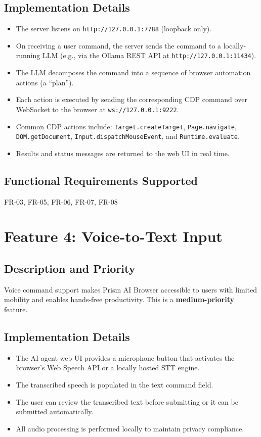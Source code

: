 \subsection{Implementation Details}
\begin{itemize}[leftmargin=*]
    \item The server listens on \texttt{http://127.0.0.1:7788} (loopback only).
    \item On receiving a user command, the server sends the command to a locally-running LLM (e.g., via the Ollama REST API at \texttt{http://127.0.0.1:11434}).
    \item The LLM decomposes the command into a sequence of browser automation actions (a ``plan'').
    \item Each action is executed by sending the corresponding CDP command over WebSocket to the browser at \texttt{ws://127.0.0.1:9222}.
    \item Common CDP actions include: \texttt{Target.createTarget}, \texttt{Page.navigate}, \texttt{DOM.getDocument}, \texttt{Input.dispatchMouseEvent}, and \texttt{Runtime.evaluate}.
    \item Results and status messages are returned to the web UI in real time.
\end{itemize}

\subsection{Functional Requirements Supported}
FR-03, FR-05, FR-06, FR-07, FR-08

\section{Feature 4: Voice-to-Text Input}

\subsection{Description and Priority}
Voice command support makes Prism AI Browser accessible to users with limited mobility and enables hands-free productivity. This is a \textbf{medium-priority} feature.

\subsection{Implementation Details}
\begin{itemize}[leftmargin=*]
    \item The AI agent web UI provides a microphone button that activates the browser's Web Speech API or a locally hosted STT engine.
    \item The transcribed speech is populated in the text command field.
    \item The user can review the transcribed text before submitting or it can be submitted automatically.
    \item All audio processing is performed locally to maintain privacy compliance.
\end{itemize}

